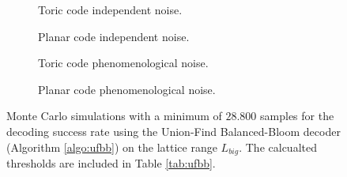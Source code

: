 \begin{figure}[htbp]
  \centering
  \begin{subfigure}[b]{0.49\textwidth}
    \begin{adjustbox}{Clip=0 1em 0 0}
      
    \end{adjustbox}
    \caption{Toric code independent noise.}
  \end{subfigure}
  \begin{subfigure}[b]{0.49\textwidth}
    \begin{adjustbox}{Clip=0 1em 0 0}
      
    \end{adjustbox}
    \caption{Planar code independent noise.}
  \end{subfigure}
  \begin{subfigure}[b]{0.49\textwidth}
    \begin{adjustbox}{Clip=0 1em 0 0}
      
    \end{adjustbox}
    \caption{Toric code phenomenological noise.}
  \end{subfigure}
  \begin{subfigure}[b]{0.49\textwidth}
    \begin{adjustbox}{Clip=0 1em 0 0}
      
    \end{adjustbox}
    \caption{Planar code phenomenological noise.}
  \end{subfigure}
  \caption{Monte Carlo simulations with a minimum of $28.800$ samples for the decoding success rate using the Union-Find Balanced-Bloom decoder (Algorithm \ref{algo:ufbb}) on the lattice range $L_{big}$. The calcualted thresholds are included in Table \ref{tab:ufbb}. }
  \label{fig:threshold_ufbbbig}
\end{figure}


